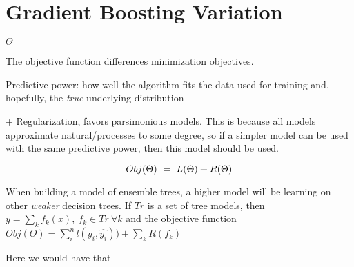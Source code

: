 \section{Gradient Boosting Variation}


$\Theta$

The objective function differences minimization objectives. 

Predictive power: how well the algorithm fits the data used for training and, hopefully, the \textit{true} underlying distribution

+ Regularization, favors parsimonious models. This is because all models approximate natural/processes to some degree, so if a simpler model can be used with the same predictive power, then this model should be used.  

\begin{equation} \label{eq:objFunction}
Obj(\Theta) \ = \ L(\Theta) + R(\Theta)
\\
\end{equation}

When building a model of ensemble trees, a higher model will be learning on other \textit{weaker} decision trees. If $Tr$ is a set of tree models, then $ y = \sum_k f_k(x) , \ f_k \in Tr \ \forall k $ and the objective function $Obj(\Theta) = \sum_i^n l(y_i,\hat{y_i}))  +  \sum_k R(f_k) $ 


Here we would have that 



